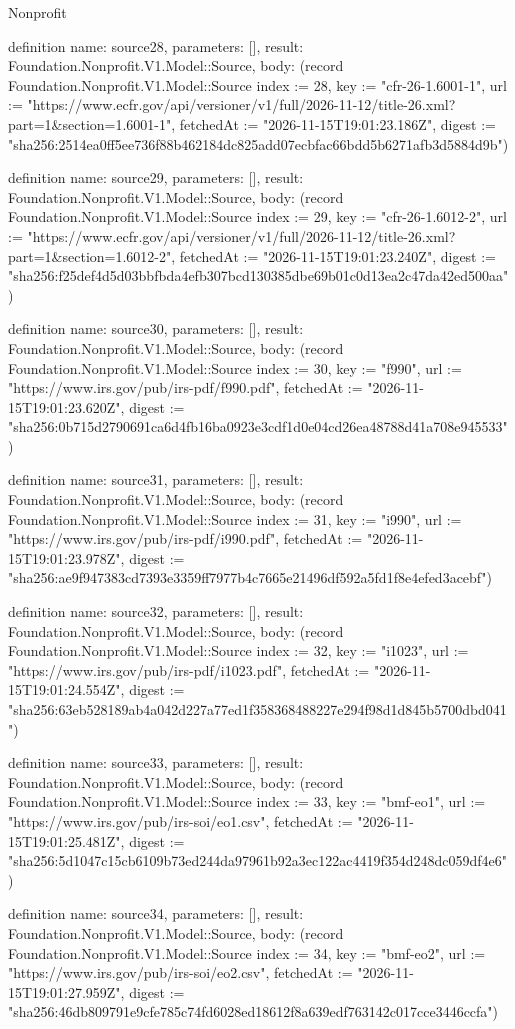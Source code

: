 \begin{lexlean}{Nonprofit}
\begin{semanticmodule}
definition{
  name: source28,
  parameters: [],
  result: Foundation.Nonprofit.V1.Model::Source,
  body: (record Foundation.Nonprofit.V1.Model::Source {index := 28, key := "cfr-26-1.6001-1", url := "https://www.ecfr.gov/api/versioner/v1/full/2026-11-12/title-26.xml?part=1&section=1.6001-1", fetchedAt := "2026-11-15T19:01:23.186Z", digest := "sha256:2514ea0ff5ee736f88b462184dc825add07ecbfac66bdd5b6271afb3d5884d9b"})
}

definition{
  name: source29,
  parameters: [],
  result: Foundation.Nonprofit.V1.Model::Source,
  body: (record Foundation.Nonprofit.V1.Model::Source {index := 29, key := "cfr-26-1.6012-2", url := "https://www.ecfr.gov/api/versioner/v1/full/2026-11-12/title-26.xml?part=1&section=1.6012-2", fetchedAt := "2026-11-15T19:01:23.240Z", digest := "sha256:f25def4d5d03bbfbda4efb307bcd130385dbe69b01c0d13ea2c47da42ed500aa"})
}

definition{
  name: source30,
  parameters: [],
  result: Foundation.Nonprofit.V1.Model::Source,
  body: (record Foundation.Nonprofit.V1.Model::Source {index := 30, key := "f990", url := "https://www.irs.gov/pub/irs-pdf/f990.pdf", fetchedAt := "2026-11-15T19:01:23.620Z", digest := "sha256:0b715d2790691ca6d4fb16ba0923e3cdf1d0e04cd26ea48788d41a708e945533"})
}

definition{
  name: source31,
  parameters: [],
  result: Foundation.Nonprofit.V1.Model::Source,
  body: (record Foundation.Nonprofit.V1.Model::Source {index := 31, key := "i990", url := "https://www.irs.gov/pub/irs-pdf/i990.pdf", fetchedAt := "2026-11-15T19:01:23.978Z", digest := "sha256:ae9f947383cd7393e3359ff7977b4c7665e21496df592a5fd1f8e4efed3acebf"})
}

definition{
  name: source32,
  parameters: [],
  result: Foundation.Nonprofit.V1.Model::Source,
  body: (record Foundation.Nonprofit.V1.Model::Source {index := 32, key := "i1023", url := "https://www.irs.gov/pub/irs-pdf/i1023.pdf", fetchedAt := "2026-11-15T19:01:24.554Z", digest := "sha256:63eb528189ab4a042d227a77ed1f358368488227e294f98d1d845b5700dbd041"})
}

definition{
  name: source33,
  parameters: [],
  result: Foundation.Nonprofit.V1.Model::Source,
  body: (record Foundation.Nonprofit.V1.Model::Source {index := 33, key := "bmf-eo1", url := "https://www.irs.gov/pub/irs-soi/eo1.csv", fetchedAt := "2026-11-15T19:01:25.481Z", digest := "sha256:5d1047c15cb6109b73ed244da97961b92a3ec122ac4419f354d248dc059df4e6"})
}

definition{
  name: source34,
  parameters: [],
  result: Foundation.Nonprofit.V1.Model::Source,
  body: (record Foundation.Nonprofit.V1.Model::Source {index := 34, key := "bmf-eo2", url := "https://www.irs.gov/pub/irs-soi/eo2.csv", fetchedAt := "2026-11-15T19:01:27.959Z", digest := "sha256:46db809791e9cfe785c74fd6028ed18612f8a639edf763142c017cce3446ccfa"})
}


\end{semanticmodule}
\end{lexlean}

